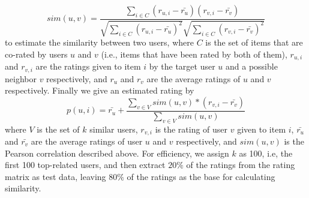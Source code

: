 $$ sim(u,v) = \frac{\sum_{i\in C}(r_{u,i}-\bar{r_u})(r_{v,i}-\bar{r_v})}{\sqrt{\sum_{i\in C}(r_{u,i}-\bar{r_u})^2}\sqrt{\sum_{i\in C}(r_{v,i}-\bar{r_v})^2}} $$
to estimate the similarity between two users, where $C$ is the set of items that are co-rated by users $u$ and $v$ (i.e., items
that have been rated by both of them), $r_{u,i}$ and $r_{v,i}$ are the ratings given to item $i$ by the target user $u$ and a possible neighbor $v$ respectively, and $r_u$ and $r_v$ are the average ratings of $u$ and $v$ respectively. Finally we give an estimated rating by $$p(u,i) = \bar{r_u} + \frac{\sum_{v\in V}sim(u,v)*(r_{v,i}-\bar{r_v})}{\sum_{v\in V}sim(u,v)}$$
where $V$ is the set of $k$ similar users, $r_{v,i}$ is the rating of user $v$ given to item $i$, $\bar{r_u}$ and $\bar{r_v}$ are the average ratings of user $u$ and $v$ respectively, and $sim(u, v)$ is the Pearson correlation described above.
For efficiency, we assign $k$ as 100, i.e, the first 100 top-related users, and then extract $20\%$ of the ratings from the rating matrix as test data, leaving $80\%$ of the ratings as the base for calculating similarity.